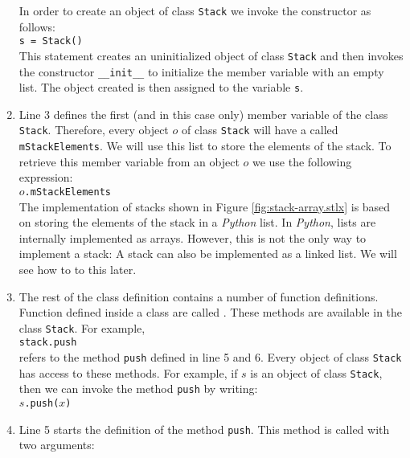 \begin{enumerate}
      In order to create an object of class \texttt{Stack} we invoke the constructor as follows:
      \\[0.2cm]
      \hspace*{1.3cm}
      \texttt{s = Stack()}
      \\[0.2cm]
      This statement creates an uninitialized object of class \texttt{Stack} and then invokes 
      the constructor \texttt{\_\_init\_\_} to initialize the member variable with an empty list.
      The object created is then assigned to the variable \texttt{s}.
\item Line 3 defines the first (and in this case only) member variable of the class \texttt{Stack}.
      Therefore, every object $o$ of class \texttt{Stack} will have a  called
      \texttt{mStackElements}. 
      We will use this list to store the elements of the stack.  To retrieve this member variable from
      an object $o$ we use the following expression:
      \\[0.2cm]
      \hspace*{1.3cm}
      $o$\texttt{.mStackElements}
      \\[0.2cm]
      The implementation of stacks shown
      in Figure \ref{fig:stack-array.stlx} is based on storing the elements of the stack in a
      \textsl{Python} list.  In \textsl{Python}, lists are internally implemented as arrays.  However,
      this is not the only way to implement a stack: A stack can also be implemented as a linked list.
      We will see how to to this later.
\item The rest of the class definition contains a number of function definitions.  Function defined inside
      a class are called .  These methods are available in the class \texttt{Stack}.  For example,
      \\[0.2cm]
      \hspace*{1.3cm}
      \texttt{stack.push}
      \\[0.2cm]
      refers to the method \texttt{push} defined in line 5 and 6. Every object of class
      \texttt{Stack} has access to these 
      methods.  For example, if $s$ is an object of class \texttt{Stack}, then we can invoke the
      method \texttt{push} by writing:
      \\[0.2cm]
      \hspace*{1.3cm}
      $s$\texttt{.push($x$)}
\item Line 5 starts the definition of the method \texttt{push}.  This method is called with two arguments:
      \begin{enumerate}[(a)]

\end{enumerate}
\end{enumerate}
